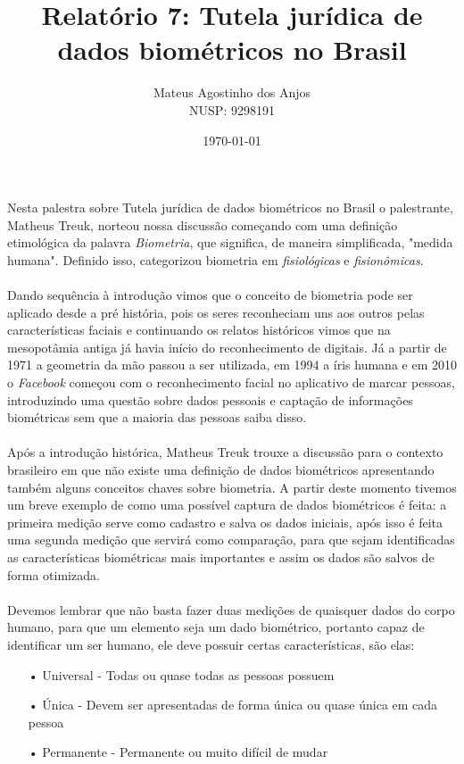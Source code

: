 \documentclass[12pt]{article}
\title{Relatório 7: Tutela jurídica de dados biométricos no Brasil}
\author{Mateus Agostinho dos Anjos\\NUSP: 9298191}
\date{\today}
\begin{document}
	\maketitle
	\paragraph{}
		Nesta palestra sobre Tutela jurídica de dados biométricos no Brasil
		o palestrante, Matheus Treuk, norteou nossa discussão começando com uma
		definição etimológica da palavra \textit{Biometria}, que significa, de maneira 
		simplificada, "medida humana".  Definido isso, categorizou biometria em
		\textit{fisiológicas} e \textit{fisionômicas}.
	\paragraph{}
		Dando sequência à introdução vimos que o conceito de biometria pode ser
		aplicado desde a pré história, pois os seres reconheciam uns aos outros pelas
		características faciais e continuando os relatos históricos vimos que na 
		mesopotâmia antiga já havia início do reconhecimento de digitais. Já a partir de
		1971 a geometria da mão passou a ser utilizada, em 1994 a íris humana e
		em 2010 o \textit{Facebook} começou com o reconhecimento facial no
		aplicativo de marcar pessoas, introduzindo uma questão sobre dados 
		pessoais e captação de informações biométricas sem que a maioria das
		pessoas saiba disso.
	\paragraph{}
		Após a introdução histórica, Matheus Treuk trouxe a discussão para o contexto
		brasileiro em que não existe uma definição de dados biométricos apresentando
		também alguns conceitos chaves sobre biometria. A partir deste momento
		tivemos um breve exemplo de como uma possível captura de dados biométricos
		é feita: a primeira medição serve como cadastro e salva os dados iniciais, após
		isso é feita uma segunda medição que servirá como comparação, para que
		sejam identificadas as características biométricas mais importantes e assim
		os dados são salvos de forma otimizada.
	\paragraph{}
		Devemos lembrar que não basta fazer duas medições de quaisquer dados do
		corpo humano, para que um elemento seja um dado biométrico, portanto capaz
		de identificar um ser humano, ele deve possuir certas características, são
		elas:
		\begin{itemize}
			\item[•]
				Universal - Todas ou quase todas as pessoas possuem
			\item[•]
				Única - Devem ser apresentadas de forma única ou quase única em cada
				pessoa
			\item[•]
				Permanente - Permanente ou muito difícil de mudar		
		\end{itemize}			
\end{document}
